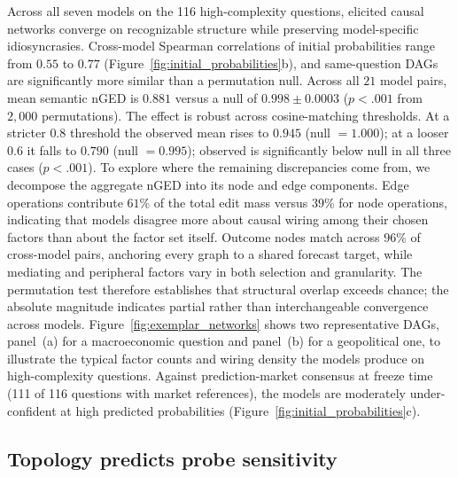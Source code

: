 \documentclass[11pt]{article}
\begin{document}







Across all seven models on the 116 high-complexity questions, elicited causal networks converge on recognizable structure while preserving model-specific idiosyncrasies. Cross-model Spearman correlations of initial probabilities range from $0.55$ to $0.77$ (Figure~\ref{fig:initial_probabilities}b), and same-question DAGs are significantly more similar than a permutation null. Across all $21$ model pairs, mean semantic nGED is $0.881$ versus a null of $0.998 \pm 0.0003$ ($p < .001$ from $2{,}000$ permutations). The effect is robust across cosine-matching thresholds. At a stricter $0.8$ threshold the observed mean rises to $0.945$ (null $= 1.000$); at a looser $0.6$ it falls to $0.790$ (null $= 0.995$); observed is significantly below null in all three cases ($p < .001$). To explore where the remaining discrepancies come from, we decompose the aggregate nGED into its node and edge components. Edge operations contribute $61$\% of the total edit mass versus $39$\% for node operations, indicating that models disagree more about causal wiring among their chosen factors than about the factor set itself. Outcome nodes match across $96$\% of cross-model pairs, anchoring every graph to a shared forecast target, while mediating and peripheral factors vary in both selection and granularity. The permutation test therefore establishes that structural overlap exceeds chance; the absolute magnitude indicates partial rather than interchangeable convergence across models. Figure~\ref{fig:exemplar_networks} shows two representative DAGs, panel~(a) for a macroeconomic question and panel~(b) for a geopolitical one, to illustrate the typical factor counts and wiring density the models produce on high-complexity questions. Against prediction-market consensus at freeze time (111 of 116 questions with market references), the models are moderately under-confident at high predicted probabilities (Figure~\ref{fig:initial_probabilities}c).

\subsection{Topology predicts probe sensitivity}
\label{sec:results-topology}
\end{document}

